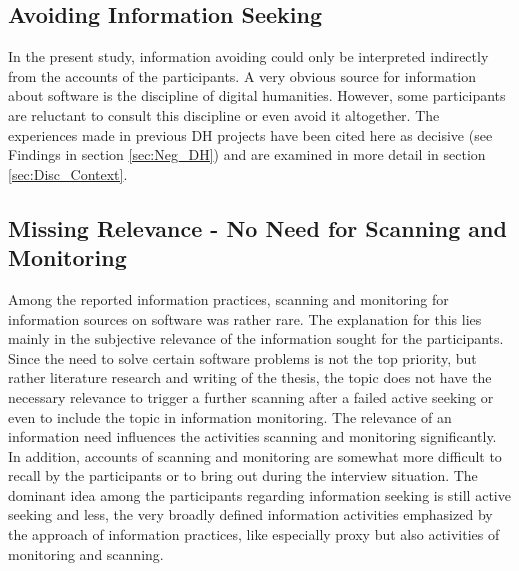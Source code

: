 \documentclass[12pt, a4paper, titlepage, oneside, abstract=true, toc=listof, toc=bibliography, BCOR=1cm]{scrreprt}
\begin{document}
{\subsection*{Avoiding Information Seeking}

In the present study, information avoiding could only be interpreted indirectly from the accounts of the participants. A very obvious source for information about software is the discipline of digital humanities. However, some participants are reluctant to consult this discipline or even avoid it altogether. The experiences made in previous DH projects have been cited here as decisive (see Findings in section \ref{sec:Neg_DH}) and are examined in more detail in section \ref{sec:Disc_Context}. 

\subsection*{Missing Relevance - No Need for Scanning and Monitoring}

Among the reported information practices, scanning and monitoring for information sources on software was rather rare. The explanation for this lies mainly in the subjective relevance \citep{Schamber1990} of the information sought for the participants. Since the need to solve certain software problems is not the top priority, but rather literature research and writing of the thesis, the topic does not have the necessary relevance to trigger a further scanning after a failed active seeking or even to include the topic in information monitoring. The relevance of an information need influences the activities scanning and monitoring significantly. In addition, accounts of scanning and monitoring are somewhat more difficult to recall by the participants or to bring out during the interview situation. The dominant idea among the participants regarding information seeking is still active seeking and less, the very broadly defined information activities emphasized by the approach of information practices, like especially proxy but also activities of monitoring and scanning.

}
\end{document}
